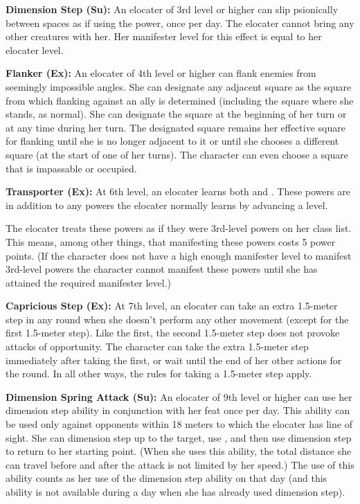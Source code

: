 {\textbf{Dimension Step (Su):} An elocater of 3rd level or higher can slip psionically between spaces as if using the  power, once per day. The elocater cannot bring any other creatures with her. Her manifester level for this effect is equal to her elocater level.

\textbf{Flanker (Ex):} An elocater of 4th level or higher can flank enemies from seemingly impossible angles. She can designate any adjacent square as the square from which flanking against an ally is determined (including the square where she stands, as normal). She can designate the square at the beginning of her turn or at any time during her turn. The designated square remains her effective square for flanking until she is no longer adjacent to it or until she chooses a different square (at the start of one of her turns). The character can even choose a square that is impassable or occupied.

\textbf{Transporter (Ex):} At 6th level, an elocater learns both  and . These powers are in addition to any powers the elocater normally learns by advancing a level.

The elocater treats these powers as if they were 3rd-level powers on her class list. This means, among other things, that manifesting these powers costs 5 power points. (If the character does not have a high enough manifester level to manifest 3rd-level powers the character cannot manifest these powers until she has attained the required manifester level.)

\textbf{Capricious Step (Ex):} At 7th level, an elocater can take an extra 1.5-meter step in any round when she doesn't perform any other movement (except for the first 1.5-meter step). Like the first, the second 1.5-meter step does not provoke attacks of opportunity. The character can take the extra 1.5-meter step immediately after taking the first, or wait until the end of her other actions for the round. In all other ways, the rules for taking a 1.5-meter step apply.

\textbf{Dimension Spring Attack (Su):} An elocater of 9th level or higher can use her dimension step ability in conjunction with her  feat once per day. This ability can be used only against opponents within 18 meters to which the elocater has line of sight. She can dimension step up to the target, use , and then use dimension step to return to her starting point. (When she uses this ability, the total distance she can travel before and after the attack is not limited by her speed.) The use of this ability counts as her use of the dimension step ability on that day (and this ability is not available during a day when she has already used dimension step).

}
